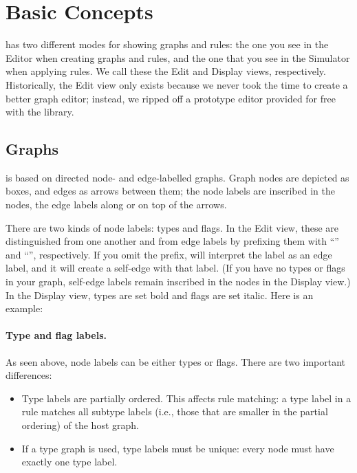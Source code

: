 \section{Basic Concepts}

\Groove has two different modes for showing graphs and rules: the one you see
in the Editor when creating graphs and rules, and the one that you see in the
Simulator when applying rules. We call these the Edit and Display views,
respectively.  Historically, the Edit view only exists because we never took
the time to create a better graph editor; instead, we ripped off a prototype
editor provided for free with the \JGraph library.

\subsection{Graphs}

\Groove is based on directed node- and edge-labelled graphs. Graph nodes are
depicted as boxes, and edges as arrows between them; the node labels are
inscribed in the nodes, the edge labels along or on top of the arrows.

There are two kinds of node labels: types and flags. In the Edit view, these
are distinguished from one another and from edge labels by prefixing them with
``\typeP'' and ``\flagP'', respectively. If you omit the prefix, \Groove will
interpret the label as an edge label, and it will create a self-edge with that
label. (If you have no types or flags in your graph, self-edge labels remain
inscribed in the nodes in the Display view.) In the Display view, types are set
bold and flags are set italic. Here is an example:


\paragraph{Type and flag labels.}

As seen above, node labels can be either types or flags. There are two
important differences:
\begin{itemize}\noitemsep
\item Type labels are partially ordered. This affects rule matching: a type
  label in a rule matches all subtype labels (i.e., those that are smaller in
  the partial ordering) of the host graph.
\item If a type graph is used, type labels must be unique: every node must have
  exactly one type label.
\end{itemize}

